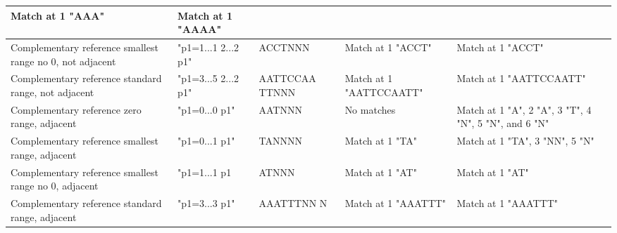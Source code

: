 \documentclass[12pt]{article}
\newcommand{\textapprox}{\raisebox{0.5ex}{\texttildelow}}
\begin{document}
\begin{appendices}
\begin{table}[H]
\begin{tabular}{p{4cm}|p{3cm}|p{2.5cm}|p{2.5cm}|p{2.5cm}}
Match at 1 "AAA" & Match at 1 "AAAA"\\ \hline
\rowcolor{lightgreen}
Complementary reference smallest range no 0, not adjacent & "p1=1...1 2...2 \textapprox p1" & ACCTNNN & 
Match at 1 "ACCT" & Match at 1 "ACCT"\\ \hline
\rowcolor{lightgreen}
Complementary reference standard range, not adjacent & "p1=3...5 2...2 \textapprox p1" & AATTCCAA TTNNN & 
Match at 1 "AATTCCAATT" & Match at 1 "AATTCCAATT"\\ \hline
\rowcolor{lightred}
Complementary reference zero range, adjacent & "p1=0...0 \textapprox p1" & AATNNN & No matches & 
Match at 1 "A", 2 "A", 3 "T", 4 "N", 5 "N", and 6 "N" \\ \hline
\rowcolor{lightred}
Complementary reference smallest range, adjacent	& "p1=0...1 \textapprox p1" & TANNNN &
 Match at 1 "TA" & Match at 1 "TA", 3 "NN", 5 "N"\\ \hline
\rowcolor{lightgreen}
Complementary reference smallest range no 0, adjacent & "p1=1...1 \textapprox p1 & ATNNN & 
Match at 1 "AT" & Match at 1 "AT" \\ \hline 
\rowcolor{lightgreen}
Complementary reference standard range, adjacent & "p1=3...3 \textapprox p1" & AAATTTNN N & 
Match at 1 "AAATTT" & Match at 1 "AAATTT"\\ \hline
\end{tabular}
\end{table}

\end{appendices}
\end{document}
